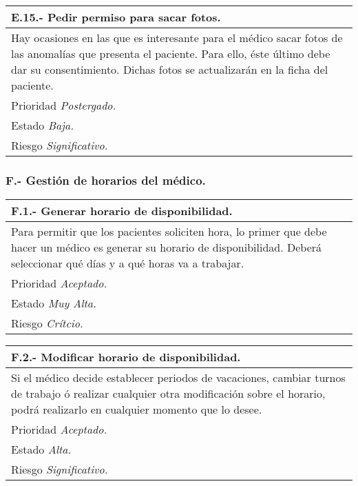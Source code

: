 	\begin{center}
	\begin{tabulary}{15cm}{|L|}
		\hline
			\bf{E.15.- Pedir permiso para sacar fotos.} \\
		\hline
			Hay ocasiones en las que es interesante para el médico sacar fotos de las anomalías que presenta el paciente. Para ello, éste último debe dar su consentimiento. Dichas fotos se actualizarán en la ficha del paciente. \\
		\hline
			Prioridad \textit{Postergado.} \\
		\hline
			Estado \textit{Baja.} \\
		\hline
			Riesgo \textit{Significativo.} \\
		\hline
	\end{tabulary}
	\end{center}


	\subsubsection{F.- Gestión de horarios del médico.}

	\begin{center}
	\begin{tabulary}{15cm}{|L|}
		\hline
			\bf{F.1.- Generar horario de disponibilidad.} \\
		\hline
			Para permitir que los pacientes soliciten hora, lo primer que debe hacer un médico es generar su horario de disponibilidad. Deberá seleccionar qué días y a qué horas va a trabajar. \\
		\hline
			Prioridad \textit{Aceptado.} \\
		\hline
			Estado \textit{Muy Alta.} \\
		\hline
			Riesgo \textit{Crítcio.} \\
		\hline
	\end{tabulary}
	\end{center}

	\begin{center}
	\begin{tabulary}{15cm}{|L|}
		\hline
			\bf{F.2.- Modificar horario de disponibilidad.} \\
		\hline
			Si el médico decide establecer periodos de vacaciones, cambiar turnos de trabajo ó realizar cualquier otra modificación sobre el horario, podrá realizarlo en cualquier momento que lo desee. \\
		\hline
			Prioridad \textit{Aceptado.} \\
		\hline
			Estado \textit{Alta.} \\
		\hline
			Riesgo \textit{Significativo.} \\
		\hline
	\end{tabulary}
	\end{center}

